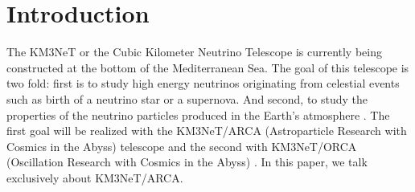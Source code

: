 

\chapter{Introduction}






The KM3NeT or the Cubic Kilometer Neutrino Telescope is currently being
constructed at the bottom of the Mediterranean Sea. The goal of this telescope
is two fold: first is to study high energy neutrinos originating from celestial
events such as birth of a neutrino star or a supernova. And second, to study
the properties of the neutrino particles produced in the Earth's atmosphere
\cite{adrian2016letter}. The first goal will be realized with the KM3NeT/ARCA
(Astroparticle Research with Cosmics in the Abyss) telescope and the second
with KM3NeT/ORCA (Oscillation Research with Cosmics in the Abyss)
\cite{adrian2016letter}. In this paper, we talk exclusively about KM3NeT/ARCA.

